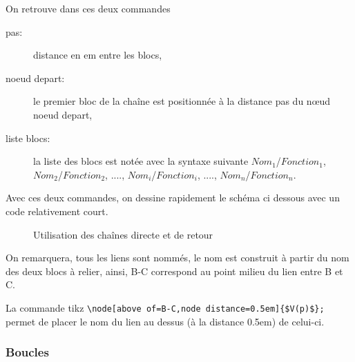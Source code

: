 \documentclass[a4paper,11pt]{article}                      %
\begin{document}
  
On retrouve dans ces deux commandes
\begin{description}
\item[pas: ] distance en em entre les blocs,
\item[noeud depart:] le premier bloc de la chaîne est positionnée à la distance pas du n\oe ud noeud depart,
\item[liste blocs: ] la liste des blocs est notée avec la syntaxe suivante $Nom_1$/$Fonction_1$, $Nom_2$/$Fonction_2$, ...., $Nom_i$/$Fonction_i$, ...., $Nom_n$/$Fonction_n$.
\end{description}


%
Avec ces deux commandes, on dessine rapidement le schéma ci dessous avec un code relativement court.
%


\begin{figure}[!htb]
\centering
\begin{tikzexampleL}[title=,]
\end{tikzexampleL}
\caption{Utilisation des chaînes directe et de retour}
\label{fig:schemacompletsimple}
\end{figure}




On remarquera, tous les liens sont nommés, le nom est construit à partir du nom des deux blocs à relier, ainsi, B-C  correspond au point milieu du lien entre B et C.

La commande tikz \verb"\node[above of=B-C,node distance=0.5em]{$V(p)$};" permet de placer le nom du lien au dessus (à la distance 0.5em) de celui-ci.


\subsubsection{Boucles}
\end{document}
